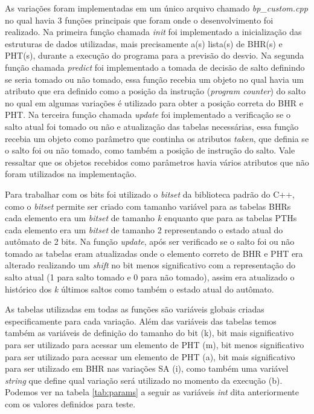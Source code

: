 \documentclass[journal, twoside]{IEEEtran}
\begin{document}
As variações foram implementadas em um único arquivo chamado \textit{bp\_custom.cpp} no qual havia 3 funções principais que foram onde o desenvolvimento foi realizado. Na primeira função chamada \textit{init} foi implementado a inicialização das estruturas de dados utilizadas, mais precisamente a(s) lista(s) de BHR(s) e PHT(s), durante a execução do programa para a previsão do desvio. Na segunda função chamada \textit{predict} foi implementado a tomada de decisão de salto definindo se seria tomado ou não tomado, essa função recebia um objeto no qual havia um atributo que era definido como a posição da instrução (\textit{program counter}) do salto no qual em algumas variações é utilizado para obter a posição correta do BHR e PHT.  Na terceira função chamada \textit{update} foi implementado a verificação se o salto atual foi tomado ou não e atualização das tabelas necessárias, essa função recebia um objeto como parâmetro que continha os atributos \textit{taken}, que definia se o salto foi ou não tomado, como também a posição de instrução do salto. Vale ressaltar que os objetos recebidos como parâmetros havia vários atributos que não foram utilizados na implementação.

Para trabalhar com os bits foi utilizado o \textit{bitset} da biblioteca padrão do C++, como o \textit{bitset} permite ser criado com tamanho variável para as tabelas BHRs cada elemento era um \textit{bitset} de tamanho \textit{k} enquanto que para as tabelas PTHs cada elemento era um \textit{bitset} de tamanho 2 representando o estado atual do autômato de 2 bits. Na função \textit{update}, após ser verificado se o salto foi ou não tomado as tabelas eram atualizadas onde o elemento correto de BHR e PHT era alterado realizando um \textit{shift} no bit menos significativo com a representação do salto atual (1 para salto tomado e 0 para não tomado), assim era atualizado o histórico dos \textit{k} últimos saltos como também o estado atual do autômato.

As tabelas utilizadas em todas as funções são variáveis globais criadas especificamente para cada variação. Além das variáveis das tabelas temos também as variáveis de definição do tamanho do bit (k), bit mais significativo para ser utilizado para acessar um elemento de PHT (m), bit menos significativo para ser utilizado para acessar um elemento de PHT (a), bit mais significativo para ser utilizado em BHR nas variações SA (i), como também uma variável \textit{string} que define qual variação será utilizado no momento da execução (b). Podemos ver na tabela \ref{tab:params} a seguir as variáveis \textit{int} dita anteriormente com os valores definidos para teste.
\end{document}
